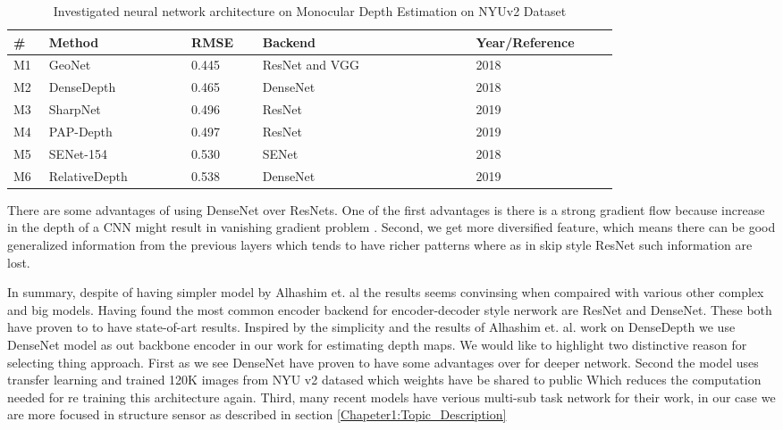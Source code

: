 \begin{table}[t]
\centering
\begin{tabular}{p{0.05\linewidth}p{0.2\linewidth}p{0.1\linewidth}p{0.3\linewidth}p{0.2\linewidth}}


\hline
\textbf{\# } & \textbf{Method} & \textbf{RMSE} & \textbf{Backend}& \textbf{Year/Reference} \\ \hline\hline
M1              & GeoNet          & 0.445             & ResNet and VGG  & 2018 \cite{qi2018geonet}          \\ \hline
M2              & DenseDepth      & 0.465             & DenseNet        & 2018 \cite{Alhashim2018}         \\ \hline
M3              & SharpNet        & 0.496             & ResNet       & 2019 \cite{ramamonjisoa2019sharpnet}\\ \hline
M4              & PAP-Depth       & 0.497             & ResNet          & 2019 \cite{Zhang_2019_CVPR}         \\ \hline
M5              & SENet-154       & 0.530             & SENet           & 2018 \cite{hu2019revisiting}          \\ \hline
M6              & RelativeDepth   & 0.538             & DenseNet        & 2019 \cite{lee2019monocular}          \\ \hline
\end{tabular}

\caption{Investigated neural network architecture on Monocular Depth Estimation on NYUv2 Dataset}
\label{table:RelatedWork_STA_Architecture}

\end{table}


There are some advantages of using DenseNet over ResNets. One of the first advantages is there is a strong gradient flow because increase in the depth of a CNN might result in vanishing gradient problem . Second, we get more diversified feature, which means there can be good generalized information from the previous layers which tends to have richer patterns where as in skip style ResNet such information are lost. 

In summary, despite of having simpler model by Alhashim et. al \cite{Alhashim2018}  the results seems convinsing when compaired with various other complex and big models. Having found the most common encoder backend for encoder-decoder style nerwork are  ResNet and DenseNet. These both have proven to to have state-of-art results. Inspired by the simplicity and the results of  Alhashim et. al. work on DenseDepth we use DenseNet model as out backbone encoder in our work for estimating depth maps. We would like to highlight two distinctive reason for selecting thing approach. First as we see DenseNet have proven to have some advantages over for deeper network. Second the model uses transfer learning and trained 120K images from NYU v2 datased which weights have be shared to public Which reduces the computation needed for re training this architecture again. Third, many recent models have verious multi-sub task network for their work, in our case we are more focused in structure sensor as described in section \ref{Chapeter1:Topic_Description}


